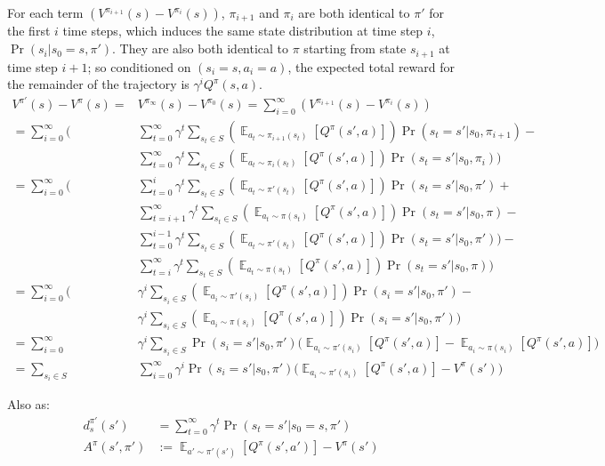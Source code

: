 \documentclass[11pt]{article}
\theoremstyle{case}
\DeclareMathOperator{\E}{\mathbb{E}}
\begin{document}
\begin{enumerate}[label=(\alph*)]
\begin{shaded}
For each term $(V^{\pi_{i+1}}(s) - V^{\pi_{i}}(s))$, $\pi_{i+1}$ and  $\pi_{i}$ are both identical to $\pi'$ for the first $i$ time steps, which induces the same state distribution at time step $i$, $\Pr(s_i|s_0=s, \pi')$. They are also both identical to $\pi$ starting from state $s_{i+1}$ at time step $i+1$; so conditioned on $(s_i=s, a_i=a)$, the expected total reward for the remainder of the trajectory is $\gamma^i Q^\pi(s,a)$.
\begin{align*}
   V^{\pi'}(s) - V^{\pi}(s) = & V^{\pi_{\infty}}(s) - V^{\pi_{0}}(s) =  \sum_{i=0}^{\infty} (V^{\pi_{i+1}}(s) - V^{\pi_{i}}(s))\\
=  \sum_{i=0}^{\infty} \big( & \sum_{t=0}^{\infty} \gamma^t  \sum_{s_t \in S} (\E_{a_t\sim \pi_{i+1}(s_t)}[Q^\pi(s',a)]) \Pr(s_t=s'|s_0, \pi_{i+1}) - \\
   &\sum_{t=0}^{\infty} \gamma^t  \sum_{s_t \in S} (\E_{a_t\sim \pi_{i}(s_t)}[Q^\pi(s',a)]) \Pr(s_t=s'|s_0, \pi_{i})\big)\\
= \sum_{i=0}^{\infty} \big( & \sum_{t=0}^{i} \gamma^t  \sum_{s_t \in S} (\E_{a_t\sim \pi'(s_t)}[Q^\pi(s',a)]) \Pr(s_t=s'|s_0, \pi') + \\
  & \sum_{t=i+1}^{\infty} \gamma^t  \sum_{s_t \in S} (\E_{a_t\sim \pi(s_t)}[Q^\pi(s',a)]) \Pr(s_t=s'|s_0, \pi)-\\
   &\sum_{t=0}^{i-1} \gamma^t  \sum_{s_t \in S} (\E_{a_t\sim \pi'(s_t)}[Q^\pi(s',a)]) \Pr(s_t=s'|s_0, \pi')\big)-\\
   &\sum_{t=i}^{\infty} \gamma^t  \sum_{s_t \in S} (\E_{a_t\sim \pi(s_t)}[Q^\pi(s',a)]) \Pr(s_t=s'|s_0, \pi)\big)\\
=\sum_{i=0}^{\infty} \big( & \gamma^i  \sum_{s_i \in S} (\E_{a_i\sim \pi'(s_i)}[Q^\pi(s',a)]) \Pr(s_i=s'|s_0, \pi') - \\
  &  \gamma^i  \sum_{s_i \in S} (\E_{a_i\sim \pi(s_i)}[Q^\pi(s',a)]) \Pr(s_i=s'|s_0, \pi')  \big)\\
=\sum_{i=0}^{\infty} & \gamma^i \sum_{s_i \in S} \Pr(s_i=s'|s_0, \pi')  \big(    \E_{a_i\sim \pi'(s_i)}[Q^\pi(s',a)] -  \E_{a_i\sim \pi(s_i)}[Q^\pi(s',a)]  \big)\\
= \sum_{s_i \in S} & \sum_{i=0}^{\infty} \gamma^i \Pr(s_i=s'|s_0, \pi') \big(    \E_{a_i\sim \pi'(s_i)}[Q^\pi(s',a)] -  V^\pi(s')  \big)
\end{align*}

Also as:
\begin{align*}
    d^{\pi'}_s(s') &= \sum_{t=0}^\infty \gamma^t\Pr(s_t=s'|s_0=s, \pi')\\
    A^\pi(s',\pi') & := \E_{a'\sim\pi'(s')} [Q^\pi(s',a')] - V^\pi(s')
\end{align*}


\end{shaded}
\end{enumerate}
\end{document}
